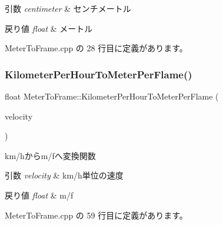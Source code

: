 \begin{DoxyParams}{引数}
{\em centimeter} & センチメートル \\
\hline
\end{DoxyParams}

\begin{DoxyRetVals}{戻り値}
{\em float} & メートル \\
\hline
\end{DoxyRetVals}


 Meter\+To\+Frame.\+cpp の 28 行目に定義があります。

\mbox{\label{class_meter_to_frame_aa041cc9bc0f37cced44f98d66807a2b4}} 
\subsubsection{\texorpdfstring{Kilometer\+Per\+Hour\+To\+Meter\+Per\+Flame()}{KilometerPerHourToMeterPerFlame()}}
{\footnotesize\ttfamily float Meter\+To\+Frame\+::\+Kilometer\+Per\+Hour\+To\+Meter\+Per\+Flame (\begin{DoxyParamCaption}\item[{float}]{velocity }\end{DoxyParamCaption})\hspace{0.3cm}{\ttfamily [static]}}



km/hからm/fへ変換関数 


\begin{DoxyParams}{引数}
{\em velocity} & km/h単位の速度 \\
\hline
\end{DoxyParams}

\begin{DoxyRetVals}{戻り値}
{\em float} & m/f \\
\hline
\end{DoxyRetVals}


 Meter\+To\+Frame.\+cpp の 59 行目に定義があります。

\mbox{\label{class_meter_to_frame_a23532d0215d188bd0915450005ee206a}} 
